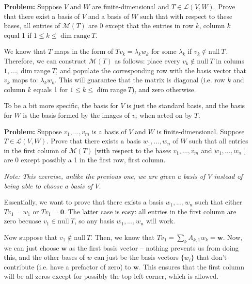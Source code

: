 \documentclass[10pt]{article}
\newcommand{\range}{\mathrm{range \ }}
\renewcommand{\null}{\mathrm{null \ }}
\newenvironment{problem}{\textbf{Problem:}}{}
\begin{document}
	\begin{problem}
		Suppose \( V \) and \( W \) are finite-dimensional and \( T \in \mathcal L(V, W) \). Prove that there 
		exist a basis of \( V \) and a basis of \( W \) such that with respect to these bases, all entries 
		of \( \mathcal M(T) \) are 0 except that the entries in row \( k \), column \( k \) equal 1 
		if \( 1 \le k \le \dim \range T \).
	\end{problem}

	\begin{solution}
		We know that \( T \) maps in the form of \( Tv_k = \lambda_k w_k \) for some \( \lambda_k \) if 
		\( v_k \not \in \null T \). Therefore, we can construct \( \mathcal M(T) \) as follows: place every 
		\( v_k \not\in \null T \) in colums \( 1, \dots, \dim \range T \), and populate the corresponding 
		row with the basis vector that \( v_k \) maps to: \( \lambda_k w_k \). This will guarantee that the 
		matrix is diagonal (i.e. row  \( k \) and column \( k \) equals 1 for \( 1 \le k\le \dim \range T \)), 
		and zero otherwise. 

		To be a bit more specific, the basis for \( V \) is just the standard basis, and the basis for 
		\( W \) is the basis formed by the images of \( v_i \) when acted on by \( T \).  
	\end{solution}

	\begin{problem}
		Suppose \( v_1, \dots, v_m \) is a basis of \( V \) and \( W \) is finite-dimensional. Suppose \( T \in 
		\mathcal L(V, W)\). Prove that there exists a basis \( w_1, \dots, w_n \) of \( W \) such that 
		all entries in the first column of \( \mathcal M(T) \) [with respect to the bases 
		\( v_1, \dots, v_m \) and \( w_1, \dots ,w_n \) ] are 0 except possibly a 1 in the first row, first 
		column. 

		\textit{Note: This exercise, unlike the previous one, we are given a basis of \( V \) instead of being 
		able to choose a basis of \( V \). }
	\end{problem}

	\begin{solution}
		Essentially, we want to prove that there exists a basis \( w_1, \dots, w_n \) such that either 
		\( Tv_1 = w_1 \) or \( Tv_1 = \mathbf 0 \). The latter case is easy: all entries in the first column are zero 
		becuase \( v_1 \in \null T \), so any basis \( w_1, \dots, w_n \) will work. 

		Now suppose that \( v_1 \not \in \null T \). Then, we know that \( Tv_1 = \sum_k A_{k, 1}w_k = \mathbf w\).
		Now, we can just choose \( \mathbf w \) as the first basis vector -- nothing prevents us from doing this, and 
		the other bases of \( w \) can just be the basis vectors \( \{w_i\}  \) that don't contribute (i.e. 
		have a prefactor of zero) to \( \mathbf w \). This ensures that the first column will be all zeros 
		except for possibly the top left corner, which is allowed.  
	\end{solution}
\end{document}
